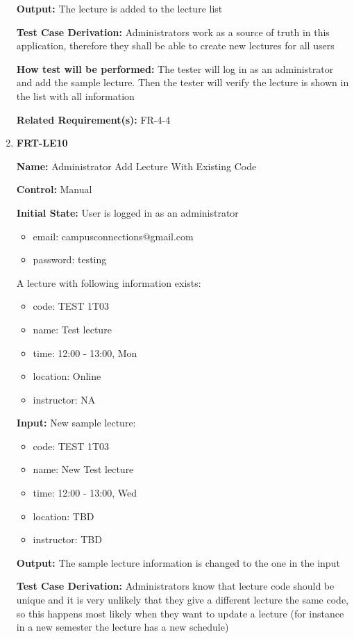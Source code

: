 \documentclass[12pt, titlepage]{article}
\begin{document}
\begin{enumerate}
\textbf{Output:} The lecture is added to the lecture list

\textbf{Test Case Derivation:} Administrators work as a source of truth in this application, therefore they shall be able to create new lectures for all users
					
\textbf{How test will be performed:} The tester will log in as an administrator and add the sample lecture. Then the tester will verify the lecture is shown in the list with all information

\textbf{Related Requirement(s):} FR-4-4

\item{\textbf{FRT-LE10}}

\textbf{Name:} Administrator Add Lecture With Existing Code

\textbf{Control:} Manual
					
\textbf{Initial State:} User is logged in as an administrator
\begin{itemize}
\item email: campusconnections@gmail.com
\item password: testing
\end{itemize}

A lecture with following information exists:
\begin{itemize}
\item code: TEST 1T03
\item name: Test lecture
\item time: 12:00 - 13:00, Mon
\item location: Online
\item instructor: NA
\end{itemize}

\textbf{Input:} New sample lecture:
\begin{itemize}
\item code: TEST 1T03
\item name: New Test lecture
\item time: 12:00 - 13:00, Wed
\item location: TBD
\item instructor: TBD
\end{itemize}
					
\textbf{Output:} The sample lecture information is changed to the one in the input

\textbf{Test Case Derivation:} Administrators know that lecture code should be unique and it is very unlikely that they give a different lecture the same code, so this happens most likely when they want to update a lecture (for instance in a new semester the lecture has a new schedule)
					

\end{enumerate}
\end{document}
